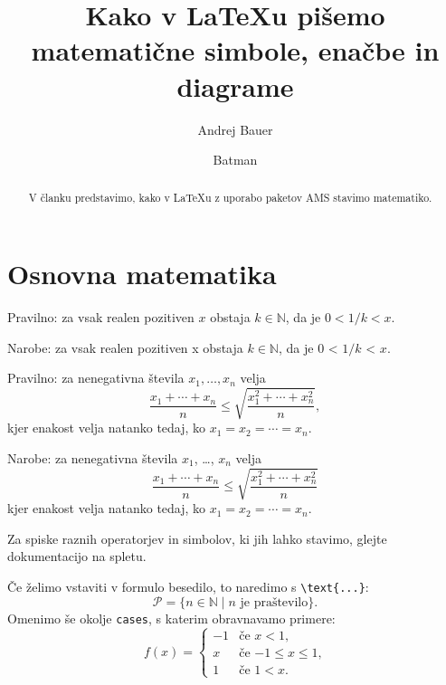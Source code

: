 \documentclass{amsart}
\title[Matematika v {\LaTeX}u]{Kako v {\LaTeX}u pišemo matematične simbole, enačbe in diagrame}
\author{Andrej Bauer}
\author{Batman}
\begin{document}
\maketitle

\begin{abstract}
  V članku predstavimo, kako v {\LaTeX}u z uporabo paketov AMS stavimo matematiko.
\end{abstract}

\section{Osnovna matematika}

Pravilno: za vsak realen pozitiven $x$ obstaja $k \in \mathbb{N}$, da je $0 < 1/k < x$.

Narobe: za vsak realen pozitiven x obstaja $k \in \mathbb{N}$, da je $0$ < $1/k$ < $x$.


Pravilno: za nenegativna števila $x_1, \ldots, x_n$ velja
%
\[
  \frac{x_1 + \cdots + x_n}{n} \leq
  \sqrt{\frac{x_1^2 + \cdots + x_n^2}{n}},
\]
%
kjer enakost velja natanko tedaj, ko $x_1 = x_2 = \cdots = x_n$.

Narobe: za nenegativna števila $x_1$, \dots, $x_n$ velja
\[
  \frac{x_1 + \cdots + x_n}{n} \leq
  \sqrt{\frac{x_1^2 + \cdots + x_n^2}{n}}
\]
kjer enakost velja natanko tedaj, ko $x_1 = x_2 = \cdots = x_n$.

Za spiske raznih operatorjev in simbolov, ki jih lahko stavimo, glejte dokumentacijo na
spletu.

Če želimo vstaviti v formulo besedilo, to naredimo s \verb|\text{...}|:
%
\begin{equation*}
  \mathcal{P} = \{ n \in \mathbb{N} \mid \text{$n$ je praštevilo} \}.
\end{equation*}
%
Omenimo še okolje \texttt{cases}, s katerim obravnavamo primere:
%
\[
  f(x) =
  \begin{cases}
    -1 & \text{če $x < 1$,} \\
     x & \text{če $-1 \leq x \leq 1$,} \\
     1 & \text{če $1 < x$.}
  \end{cases}
\]
%
\end{document}
